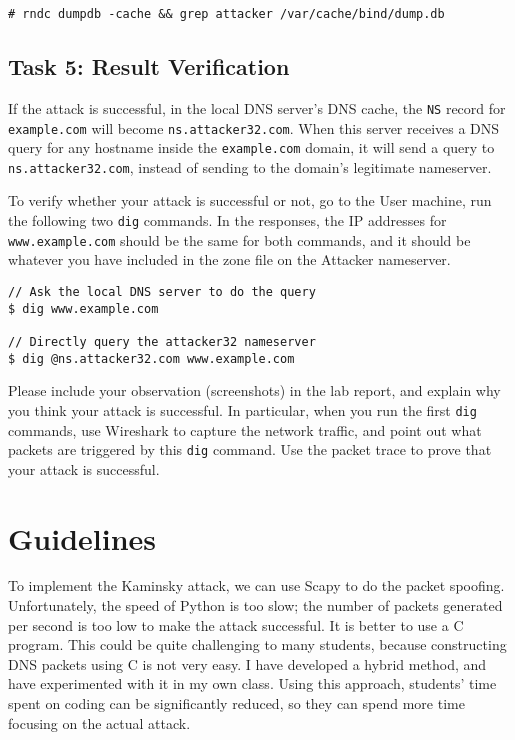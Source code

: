 \begin{lstlisting}
# rndc dumpdb -cache && grep attacker /var/cache/bind/dump.db
\end{lstlisting}
 

\subsection{Task 5: Result Verification}

If the attack is successful, in the local DNS server's DNS cache, 
the {\tt NS} record for \texttt{example.com} will become 
\texttt{ns.attacker32.com}.
When this server receives a DNS query for any hostname
inside the \texttt{example.com} domain,  it will
send a query to \texttt{ns.attacker32.com}, instead of 
sending to the domain's legitimate nameserver. 


To verify whether your attack is successful or not, 
go to the User machine, run the following two
\texttt{dig} commands. In the responses, the IP addresses for 
\texttt{www.example.com} should be the same for both 
commands, and it should be whatever you have included
in the zone file on the Attacker nameserver. 

\begin{lstlisting}
// Ask the local DNS server to do the query
$ dig www.example.com

// Directly query the attacker32 nameserver
$ dig @ns.attacker32.com www.example.com
\end{lstlisting}
 
Please include your observation (screenshots) in the lab 
report, and explain why you think your attack is successful. 
In particular, when you run the first \texttt{dig} commands,
use Wireshark to capture the network traffic, and 
point out what packets are triggered by this
\texttt{dig} command. Use the packet trace to 
prove that your attack is successful. 




\section{Guidelines} 

To implement the Kaminsky attack, we can use Scapy to do the packet spoofing. Unfortunately,
the speed of Python is too slow; the number of packets generated per second is too low to
make the attack successful. It is better to use a C program. This could
be quite challenging to many students, because constructing DNS packets using C is not very
easy. I have developed a hybrid method, and have experimented with it in my own class. Using
this approach, students' time spent on coding can be significantly reduced, so they can spend
more time focusing on the actual attack.


